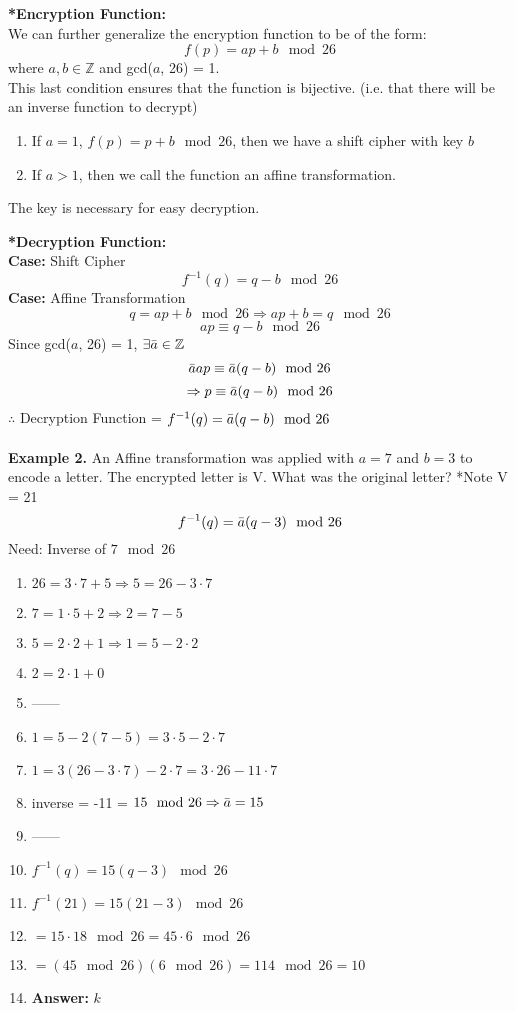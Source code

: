 \documentclass [12pt]{article}
\begin{document}
\noindent\textbf{*Encryption Function:}\\
We can further generalize the encryption function to be of the form:
\[f(p) = ap+b\mod 26\]
where $a,b\in\mathbb{Z}$ and gcd($a$, 26) = 1.\\
This last condition ensures that the function is bijective. (i.e. that there will be an inverse function to decrypt)\\
\begin{enumerate}[*]
    \item If $a=1$, $f(p)=p+b\mod26$, then we have a shift cipher with key $b$
    \item If $a>1$, then we call the function an affine transformation.
\end{enumerate}
The key is necessary for easy decryption.
\vspace{0.2in}

\noindent\textbf{*Decryption Function:}\\
\noindent\textbf{Case:} Shift Cipher\\
\[f^{-1}(q)=q-b\mod26\]
\noindent\textbf{Case:} Affine Transformation\\
\[q=ap+b\mod26 \Rightarrow ap+b=q\mod26\]
\[ap\equiv q-b\mod26\]
Since gcd($a$, 26) = 1, $\exists \Bar{a}\in\mathbb{Z}$
\[\Bar{a}ap\equiv \Bar{a}(q-b)\mod26\]
\[\Rightarrow p \equiv \Bar{a}(q-b)\mod26\]
$\therefore$ Decryption Function = $f^{-1}(q)=\Bar{a}(q-b)\mod26$\\
\vspace{0.2in}
\\
\noindent\textbf{Example 2.} An Affine transformation was applied with $a=7$ and $b=3$ to encode a letter. The encrypted letter is V. What was the original letter? *Note V = 21
\[f^{-1}(q) = \Bar{a}(q-3)\mod26\]
Need: Inverse of $7\mod26$
\begin{enumerate}[\quad]
    \item $26=3\cdot7+5\Rightarrow5=26-3\cdot7$
    \item $7=1\cdot5+2\Rightarrow2=7-5$
    \item $5=2\cdot2+1\Rightarrow1=5-2\cdot2$
    \item $2=2\cdot1+0$
    \item ------
    \item $1=5-2(7-5)=3\cdot5-2\cdot7$
    \item $1=3(26-3\cdot7)-2\cdot7=3\cdot26-11\cdot7$
    \item inverse = -11 = $15\mod26\Rightarrow\Bar{a}=15$
    \item ------
    \item $f^{-1}(q) = 15(q-3)\mod26$
    \item $f^{-1}(21) = 15(21-3)\mod26$
    \item $=15\cdot18\mod26=45\cdot6\mod26$
    \item $=(45\mod26)(6\mod26)=114\mod26=10$
    \item\textbf{Answer:} $k$
\end{enumerate}
\vspace{0.2in}
\end{document}
